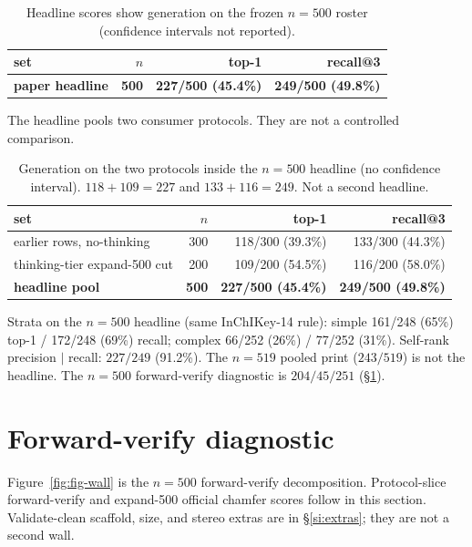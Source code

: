 \documentclass[11pt]{article}
\begin{document}
\begin{table}[h]
\caption{Headline scores show generation on the frozen $n{=}500$ roster
(confidence intervals not reported).}
\centering
\small
\begin{tabular}{@{}lrrr@{}}
\toprule
set & $n$ & top-1 & recall@3 \\
\midrule
\textbf{paper headline} & \textbf{500} & \textbf{227/500 (45.4\%)} & \textbf{249/500 (49.8\%)} \\
\bottomrule
\end{tabular}
\end{table}

The headline pools two consumer protocols.
They are not a controlled comparison.

\begin{table}[h]
\caption{Generation on the two protocols inside the $n{=}500$ headline
(no confidence interval).
$118+109=227$ and $133+116=249$.
Not a second headline.}
\centering
\small
\begin{tabular}{@{}lrrr@{}}
\toprule
set & $n$ & top-1 & recall@3 \\
\midrule
earlier rows, no-thinking & 300 & 118/300 (39.3\%) & 133/300 (44.3\%) \\
thinking-tier expand-500 cut & 200 & 109/200 (54.5\%) & 116/200 (58.0\%) \\
\textbf{headline pool} & \textbf{500} & \textbf{227/500 (45.4\%)} & \textbf{249/500 (49.8\%)} \\
\bottomrule
\end{tabular}
\end{table}

Strata on the $n{=}500$ headline (same InChIKey-14 rule):
simple 161/248 (65\%) top-1 / 172/248 (69\%) recall;
complex 66/252 (26\%) / 77/252 (31\%).
Self-rank precision $|$ recall: $227/249$ (91.2\%).
The $n{=}519$ pooled print ($243/519$) is not the headline.
The $n{=}500$ forward-verify diagnostic is $204/45/251$ (\S\ref{si:fverify}).

\section{Forward-verify diagnostic}
\label{si:fverify}

Figure~\ref{fig:fig-wall} is the $n{=}500$ forward-verify decomposition.
Protocol-slice forward-verify and expand-500 official chamfer scores
follow in this section.
Validate-clean scaffold, size, and stereo extras are in \S\ref{si:extras};
they are not a second wall.
\end{document}
